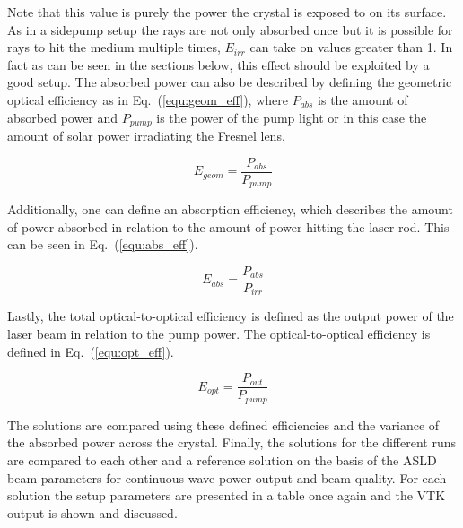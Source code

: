 \documentclass[a4paper,10pt]{article}
\newcommand{\equref}[1]{Eq.~(\ref{#1})}
\begin{document}
    Note that this value is purely the power the crystal is exposed
    to on its surface.
    As in a sidepump setup the rays are not only absorbed once but
    it is possible for rays to hit the medium multiple times,
    $E_{irr}$ can take on values greater than 1.
    In fact as can be seen in the sections below, this effect should
    be exploited by a good setup.
    The absorbed power can also be described by defining the geometric
    optical efficiency as in \equref{equ:geom_eff}, where
    $P_{abs}$ is the amount of absorbed power and $P_{pump}$ is
    the power of the pump light or in this case the amount of
    solar power irradiating the Fresnel lens.

    \begin{equation}
        \label{equ:geom_eff}
        E_{geom} = \frac{P_{abs}}{P_{pump}}
    \end{equation}

    Additionally, one can define an absorption efficiency, which
    describes the amount of power absorbed in relation to the
    amount of power hitting the laser rod. 
    This can be seen in \equref{equ:abs_eff}.

    \begin{equation}
        \label{equ:abs_eff}
        E_{abs} = \frac{P_{abs}}{P_{irr}}
    \end{equation}

    Lastly, the total optical-to-optical efficiency is defined as
    the output power of the laser beam in relation to the pump
    power.
    The optical-to-optical efficiency is defined in \equref{equ:opt_eff}.

    \begin{equation}
        \label{equ:opt_eff}
        E_{opt} = \frac{P_{out}}{P_{pump}}
    \end{equation}

    The solutions are compared using these defined efficiencies and
    the variance of the absorbed power across the crystal.
    Finally, the solutions for the different runs are compared to
    each other and a 
    reference solution on the basis of the ASLD beam parameters
    for continuous wave power output and beam quality.
    For each solution the setup parameters are presented in a table
    once again and the VTK output is shown and discussed.
\end{document}
